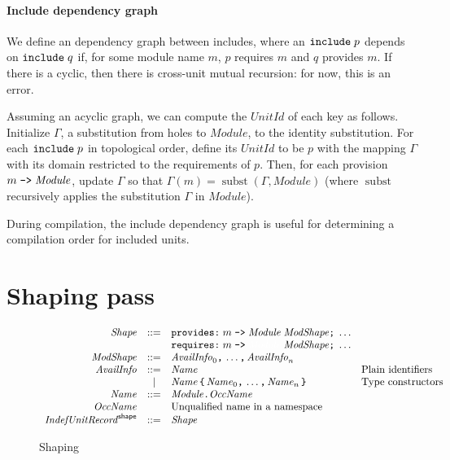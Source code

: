 \documentclass{article}
\newcommand{\I}[1]{\ensuremath{\mathit{#1}}}
\begin{document}
\paragraph{Include dependency graph}  We define an dependency graph
between includes, where an $\verb|include|\; p$ depends on
$\verb|include|\; q$ if, for some module name $m$, $p$ requires $m$ and
$q$ provides $m$.  If there is a cyclic, then there is cross-unit
mutual recursion: for now, this is an error.

Assuming an acyclic graph, we can compute the \I{UnitId} of each
key as follows.  Initialize $\Gamma$, a substitution from holes to \I{Module},
to the identity substitution. For each $\verb|include|\; p$ in topological
order, define its \I{UnitId} to be $p$ with the mapping $\Gamma$ with its
domain restricted to the requirements of $p$.  Then, for each provision
$m\; \verb|->|\; \I{Module}$, update $\Gamma$ so that
$\Gamma(m) = \operatorname{subst} (\Gamma, \I{Module})$
(where $\operatorname{subst}$ recursively applies the substitution $\Gamma$ in \I{Module}).

During compilation, the include dependency graph is useful for
determining a compilation order for included units.

\newpage
\section{Shaping pass}

\begin{figure}[htpb]
$$
\begin{array}{rcll}
\I{Shape} & ::= & \verb|provides:|\; m \; \verb|->|\; \I{Module}\; \I{ModShape} \verb|;|\; \ldots \\
      &     & \verb|requires:| \; m \; \verb|->|\; \textcolor{white}{\I{Module}}\; \I{ModShape}  \verb|;|\; \ldots \\
\I{ModShape} & ::= & \I{AvailInfo}_0 \verb|,|\, \ldots \verb|,|\, \I{AvailInfo}_n \\
\I{AvailInfo} & ::= & \I{Name} & \mbox{Plain identifiers} \\
          & |   & \I{Name} \, \verb|{| \, \I{Name}_0\verb|,| \, \ldots\verb|,| \, \I{Name}_n \, \verb|}| & \mbox{Type constructors} \\
\I{Name}   & ::= & \I{Module} \verb|.| \I{OccName} \\
\I{OccName} & & \mbox{Unqualified name in a namespace} \\
\I{IndefUnitRecord}^{\mathsf{shape}} & ::= & \I{Shape}
\end{array}
$$
\caption{Shaping} \label{fig:shaping}
\end{figure}
\end{document}

